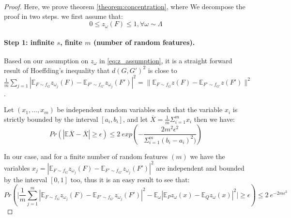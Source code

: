 \begin{proof}
Here, we prove theorem \ref{theorem:concentration}, where We decompose the proof in two steps.
we first assume that:
\begin{equation}
\label{eq:z_assumption}
    0\leq z_\omega(F)\leq 1, \forall \omega \sim  \Lambda
\end{equation}
\paragraph{Step 1: infinite $s$, finite $m$ (number of random features).} Based on our assumption on $z_\omega$ in \eqref{eq:z_assumption}, it is a straight forward result of Hoeffding's inequality that  $d(G, G')^2$ is close to $\frac{1}{m} \sum_{j=1} | \mathbb{E}_{F \sim f_G} z_{\omega_j}(F) - \mathbb{E}_{F' \sim f_{G'}} z_{\omega_j}(F') |^2 = \| \mathbb{E}_{F \sim f_G} z(F) - \mathbb{E}_{F' \sim f_{G'}} z(F')\|^2$.  
\begin{lemma} 
Let $(x_1,\ldots, x_m)$ be independent random variables such that the variable $x_i$ is strictly bounded by the interval $[a_i , b_i]$, and let $\overline{X}=\frac{1}{m}\Sigma_{i=1}^{m}x_i$ then we have:
\begin{equation}
\label{eq:Hoeffding}
    Pr(|\mathbb{E}\overline{X}-\overline{X}|\geq \epsilon)\leq 2~ exp (-\frac{2m^2\epsilon^2}{\Sigma_{i=1}^m(b_i-a_i)^2)})
\end{equation}

\end{lemma}
In our case, and for a finite number of random features $(m)$ we have the variables $x_j=| \mathbb{E}_{F \sim f_G} z_{\omega_j}(F) - \mathbb{E}_{F' \sim f_{G'}} z_{\omega_j}(F') |^2 $ are independent and bounded by the interval $[0,1]$ too, thus it is an easy result to see that:
\begin{equation}
    Pr(\Big|\frac{1}{m} \sum_{j=1}^m | \mathbb{E}_{F \sim f_G} z_{\omega_j}(F) - \mathbb{E}_{F' \sim f_{G'}} z_{\omega_j}(F') |^2 - \mathbb{E}_{\omega}  | \mathbb{E}_P z_\omega(x) - \mathbb{E}_Q z_\omega(x) |^2 \Big| \geq \epsilon) \leq 2~ e^{ -2m\epsilon^2}
\end{equation}


\end{proof}
